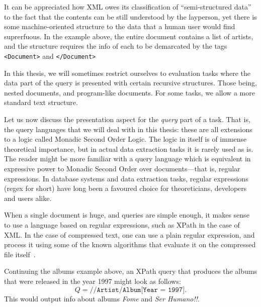 It can be appreciated how XML owes its classification of ``semi-structured data'' to the fact that the contents can be still understood by the layperson, yet there is some machine-oriented structure to the data that a human user would find suprerfuous. In the example above, the entire document contains a list of artists, and the structure requires  the info of each to be demarcated by the tags {\tt <Document>} and {\tt </Document>}


In this thesis, we will sometimes restrict ourselves to evaluation tasks where the data part of the query is presented with certain recursive structures. Those being, nested documents, and program-like documents. For some tasks, we allow a more standard text structure.

Let us now discuss the presentation aspect for the {\em query} part of a task. That is, the query languages that we will deal with in this thesis: these are all extensions to a logic called Monadic Second Order Logic. The logic in itself is of immense theoretical importance, but in actual data extraction tasks it is rarely used as is. The reader might be more familiar with a query language which is equivalent in expressive power to Monadic Second Order over documents---that is, regular expressions. In database systems and data extraction tasks, regular expressions (regex for short) have long been a favoured choice for theoreticians, developers and users alike. 

When a single document is huge, and queries are simple enough, it makes sense to use a language based on regular expressions, such as XPath in the case of XML. In the case of compressed text, one can use a plain regular expression, and process it using some of the known algorithms that evaluate it on the compressed file itself~\cite{Lohrey12,SchmidS21}. 

Continuing the albums example above, an XPath query that produces the albums that were released in the year 1997 might look as follows: 
$$Q = \texttt{//Artist/Album[Year = 1997]}.$$
 This would output info about albums {\it Fome} and {\it Ser Humano!!}.
 
